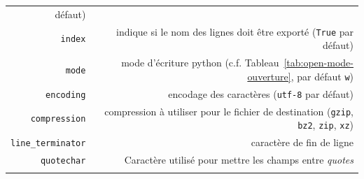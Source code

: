 \documentclass[12pt,]{book}
\numberwithin{equation}{section}
\numberwithin{countremarque}{section}
\begin{document}
\begin{longtable}[]{@{}rr@{}}
\begin{minipage}[t]{0.67\columnwidth}
défaut)\strut
\end{minipage}\tabularnewline
\begin{minipage}[t]{0.22\columnwidth}\raggedleft\strut
\texttt{index}\strut
\end{minipage} & \begin{minipage}[t]{0.67\columnwidth}\raggedleft\strut
indique si le nom des lignes doit être exporté (\texttt{True} par
défaut)\strut
\end{minipage}\tabularnewline
\begin{minipage}[t]{0.22\columnwidth}\raggedleft\strut
\texttt{mode}\strut
\end{minipage} & \begin{minipage}[t]{0.67\columnwidth}\raggedleft\strut
mode d'écriture python (c.f. Tableau~\ref{tab:open-mode-ouverture}, par
défaut \texttt{w})\strut
\end{minipage}\tabularnewline
\begin{minipage}[t]{0.22\columnwidth}\raggedleft\strut
\texttt{encoding}\strut
\end{minipage} & \begin{minipage}[t]{0.67\columnwidth}\raggedleft\strut
encodage des caractères (\texttt{utf-8} par défaut)\strut
\end{minipage}\tabularnewline
\begin{minipage}[t]{0.22\columnwidth}\raggedleft\strut
\texttt{compression}\strut
\end{minipage} & \begin{minipage}[t]{0.67\columnwidth}\raggedleft\strut
compression à utiliser pour le fichier de destination (\texttt{gzip},
\texttt{bz2}, \texttt{zip}, \texttt{xz})\strut
\end{minipage}\tabularnewline
\begin{minipage}[t]{0.22\columnwidth}\raggedleft\strut
\texttt{line\_terminator}\strut
\end{minipage} & \begin{minipage}[t]{0.67\columnwidth}\raggedleft\strut
caractère de fin de ligne\strut
\end{minipage}\tabularnewline
\begin{minipage}[t]{0.22\columnwidth}\raggedleft\strut
\texttt{quotechar}\strut
\end{minipage} & \begin{minipage}[t]{0.67\columnwidth}\raggedleft\strut
Caractère utilisé pour mettre les champs entre \emph{quotes}\strut
\end{minipage}\tabularnewline
\begin{minipage}[t]{0.22\columnwidth}\raggedleft\strut

\end{minipage}
\end{longtable}
\end{document}
